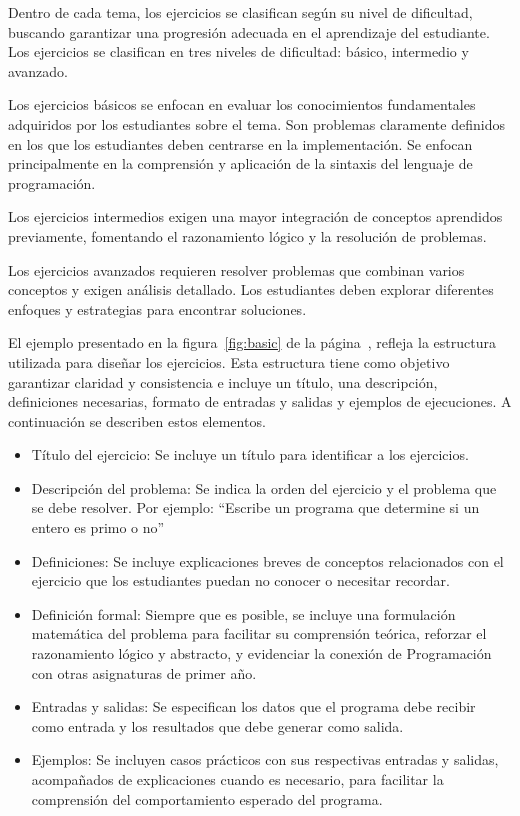 Dentro de cada tema, los ejercicios se clasifican según su nivel de dificultad, buscando garantizar una progresión adecuada en el aprendizaje del estudiante. Los ejercicios se clasifican en tres niveles de dificultad: básico, intermedio y avanzado.

Los ejercicios básicos se enfocan en evaluar los conocimientos fundamentales adquiridos por los estudiantes sobre el tema. Son problemas claramente definidos en los que los estudiantes deben centrarse en la implementación. Se enfocan principalmente en la comprensión y aplicación de la sintaxis del lenguaje de programación.

Los ejercicios intermedios exigen una mayor integración de conceptos aprendidos previamente, fomentando el razonamiento lógico y la resolución de problemas.

Los ejercicios avanzados requieren resolver problemas que combinan varios conceptos y exigen análisis detallado. Los estudiantes deben explorar diferentes enfoques y estrategias para encontrar soluciones.

El ejemplo presentado en la figura~\ref{fig:basic} de la página~\pageref{fig:basic}, refleja la estructura utilizada para diseñar los ejercicios. Esta estructura tiene como objetivo garantizar claridad y consistencia e incluye un título, una descripción, definiciones necesarias, formato de entradas y salidas y ejemplos de ejecuciones. A continuación se describen estos elementos.

\begin{itemize}
    \item Título del ejercicio: Se incluye un título para identificar a los ejercicios.
    
    \item Descripción del problema:  
    Se indica la orden del ejercicio y el problema que se debe resolver. Por ejemplo: ``Escribe un programa que determine si un entero es primo o no''

    \item Definiciones: 
    Se incluye explicaciones breves de conceptos relacionados con el ejercicio que los estudiantes puedan no conocer o necesitar recordar.

    \item Definición formal:
    Siempre que es posible, se incluye una formulación matemática del problema para facilitar su comprensión teórica, reforzar el razonamiento lógico y abstracto, y evidenciar la conexión de Programación con otras asignaturas de primer año.
    
    \item Entradas y salidas:
    Se especifican los datos que el programa debe recibir como entrada y los resultados que debe generar como salida.

    \item Ejemplos:
    Se incluyen casos prácticos con sus respectivas entradas y salidas, acompañados de explicaciones cuando es necesario, para facilitar la comprensión del comportamiento esperado del programa.
\end{itemize}

